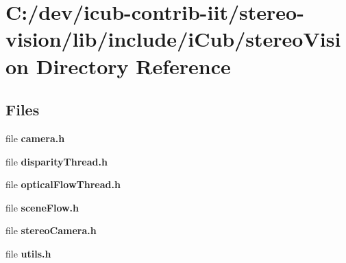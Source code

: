 \section{C\+:/dev/icub-\/contrib-\/iit/stereo-\/vision/lib/include/i\+Cub/stereo\+Vision Directory Reference}
\label{dir_50bad1a883b2386a62f50ea4f4f2f861}
\subsection*{Files}
\begin{DoxyCompactItemize}
\item 
file {\bfseries camera.\+h}
\item 
file {\bfseries disparity\+Thread.\+h}
\item 
file {\bfseries optical\+Flow\+Thread.\+h}
\item 
file {\bfseries scene\+Flow.\+h}
\item 
file {\bfseries stereo\+Camera.\+h}
\item 
file {\bfseries utils.\+h}
\end{DoxyCompactItemize}
